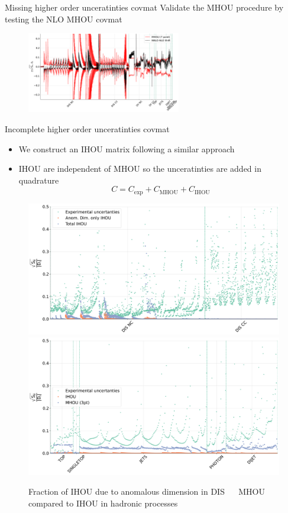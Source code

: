\documentclass[aspectratio=169, 9pt,t]{beamer}
\begin{document}
\begin{frame}{Missing higher order unceratinties covmat}
  Validate the MHOU procedure by testing the NLO MHOU covmat
  \begin{figure}[!t]
    \centering
      \includegraphics[width=0.6\textwidth]{figures/shift_validation.pdf}
  \end{figure}
\end{frame}

\begin{frame}{Incomplete higher order unceratinties covmat}
  \begin{itemize}
    \item We construct an IHOU matrix following a similar approach
    \item IHOU are independent of MHOU so the unceratinties are added in quadrature
    $$C = C_\mathrm{exp}+C_\mathrm{MHOU}+C_\mathrm{IHOU}$$
  \end{itemize}
  \begin{figure}[!t]
    \centering
    \includegraphics[width=.48\textwidth]{figures/diag_cov_dis_ihou.pdf}
    \includegraphics[width=.48\textwidth]{figures/diag_cov_jets_top_ihou_3pt_mhou.pdf}
    \caption*{Fraction of IHOU due to anomalous dimension in DIS $\quad$ MHOU compared to IHOU in hadronic processes}
  \end{figure}
\end{frame}
\end{document}
